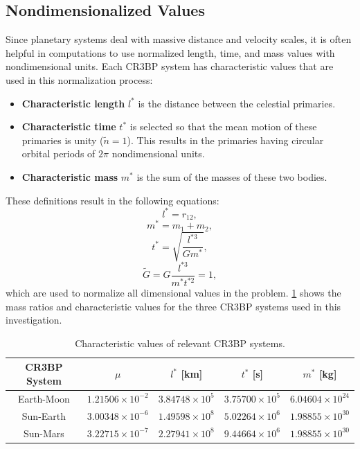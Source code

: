 \subsection{Nondimensionalized Values}
Since planetary systems deal with massive distance and velocity scales, it is often helpful in
computations to use normalized length, time, and mass values with nondimensional units. Each CR3BP
system has characteristic values that are used in this normalization process:
\begin{itemize}
    \item \textbf{Characteristic length} $l^{*}$ is the distance between the celestial primaries.
    \item \textbf{Characteristic time} $t^{*}$ is selected so that the mean motion of these
    primaries is unity ($\tilde{n}=1$). This results in the primaries having circular orbital
    periods of $2\pi$ nondimensional units.
    \item \textbf{Characteristic mass} $m^{*}$ is the sum of the masses of these two bodies.
\end{itemize}
These definitions result in the following equations:
\begin{equation}
    l^{*}=r_{12},
    \label{eq:lstar}
\end{equation}
\begin{equation}
    m^{*}=m_{1}+m_{2},
    \label{eq:mstar}
\end{equation}
\begin{equation}
    t^{*}=\sqrt{\frac{l^{*3}}{Gm^{*}}},
    \label{eq:tstar}
\end{equation}
\begin{equation}
    \tilde{G}=G\frac{l^{*3}}{m^{*}t^{*2}}=1,
    \label{eq:gstar}
\end{equation}
which are used to normalize all dimensional values in the problem. \cref{tab:charValues} shows the
mass ratios and characteristic values for the three CR3BP systems used in this investigation.

\begin{table}[H]
    \centering
    \caption{Characteristic values of relevant CR3BP systems.}
    \begin{tabular}{|c|c|c|c|c|}
        \hline
        \textbf{CR3BP System}   &   \boldmath$\mu$          &   \boldmath$l^{*}$ \textbf{[km]}  &   \boldmath$t^{*}$ \textbf{[s]}   &   \boldmath$m^{*}$ \textbf{[kg]}  \\  \hline
        Earth-Moon              &   $1.21506\times10^{-2}$  &   $3.84748\times10^{5}$           &   $3.75700\times10^{5}$           &   $6.04604\times10^{24}$          \\  \hline
        Sun-Earth               &   $3.00348\times10^{-6}$  &   $1.49598\times10^{8}$           &   $5.02264\times10^{6}$           &   $1.98855\times10^{30}$          \\  \hline
        Sun-Mars                &   $3.22715\times10^{-7}$  &   $2.27941\times10^{8}$           &   $9.44664\times10^{6}$           &   $1.98855\times10^{30}$          \\  \hline
    \end{tabular}
    \label{tab:charValues}
\end{table}

